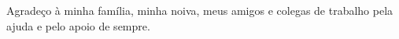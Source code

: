 \begin{agradecimentos}
Agradeço à minha família, minha noiva, meus amigos e colegas de trabalho pela ajuda e pelo apoio de sempre.
\end{agradecimentos}
